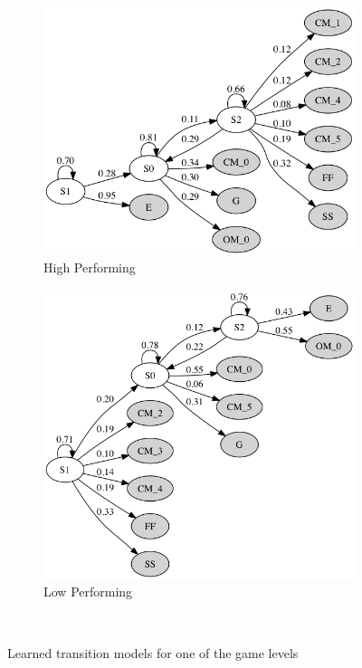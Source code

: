 \documentclass{sigchi}
\begin{document}
\begin{figure}[t]
	\centering
	\begin{subfigure}{.5\textwidth}
		\centering
		\includegraphics[width=0.9\columnwidth]{figures/high.png}
		\caption{High Performing~\label{fig:highhmm}}
	\end{subfigure}\begin{subfigure}{.5\textwidth}
		\centering
		\includegraphics[width=0.9\columnwidth]{figures/low.png}
		\caption{Low Performing~\label{fig:lowhmm}}
	\end{subfigure}
	\caption{Learned transition models for one of the game levels}~\label{fig:highvslow}
\end{figure}
\end{document}
